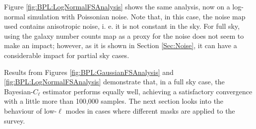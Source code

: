 Figure \ref{fig:BPL:LogNormalFSAnalysis} shows the same analysis, now on a log-normal simulation with Poissonian noise. Note that, in this case, the noise map used contains anisotropic noise, i. e. it is not constant in the sky. For full sky, using the galaxy number counts map as a proxy for the noise does not seem to make an impact; however, as it is shown in Section \ref{Sec:Noise}, it can have a considerable impact for partial sky cases.

\qquad Results from Figures \ref{fig:BPL:GaussianFSAnalysis} and \ref{fig:BPL:LogNormalFSAnalysis} demonstrate that, in a full sky case, the Bayesian-$C_{\ell}$ estimator performs equally well, achieving a satisfactory convergence with a little more than 100,000 samples. The next section looks into the behaviour of low-$\ell$ modes in cases where different masks are applied to the survey.

